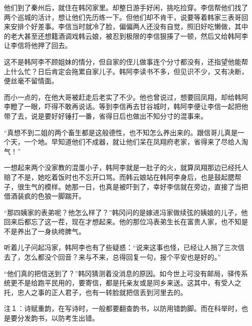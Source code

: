 他们到了秦州后，就住在韩冈家里。却整日游手好闲，挑吃捡穿。李信帮他们找了两个巡城的活计，想让他们先历练一下。但他们却不肯干，说要等着韩家三表哥回来安排个好差事。李信当时就冷了脸，偏偏两人还没有自觉，照旧好吃懒做，其中的老大甚至还想籍酒调戏韩云娘，被忍到极限的李信狠揍了一顿，然后又给韩阿李让李信将他押了回去。

这不是韩阿李不顾姐妹的情分，但自家的侄儿做事连个分寸都没有，还指望他能帮上什么忙？日后肯定会拖累自家儿子。韩阿李读书不多，但见识不少，又有决断，便丝毫不留情面。

而小一点的，在他大哥被赶走后老实了不少。他也曾说过，想要回凤翔，却给韩阿李瞪了一眼，吓得不敢再说话。等到李信再去甘谷城时，韩阿李便让李信一起把他带了去，说是要好好锤打一番，省得日后也做出不知分寸的混事来。

“真想不到二姐的两个畜生都是这般德性，也不知怎么养出来的。跟信哥儿真是一个天，一个地。早知道他们不成器，就让他们呆在凤翔府老家，省得来了尽给人淘气！”

一想起来两个没家教的混蛋小子，韩阿李就是一肚子的火，就算凤翔那边已经托人赔了不是，她吃着饭时也不忘开口骂。而韩云娘站在韩阿李身后，也是鼓起腮帮子，很生气的模样。她那一日，也真是被吓到了，幸好李信就在旁边，直接了当把借酒装疯的色狼一脚踹开。

“那四姨家的表弟呢？他怎么样了？”韩冈问的是嫁进冯家做续弦的姨娘的儿子，他回来后都忘了这一茬，现在才想起来。他的那位冯表弟生长在富贵人家，也不知是不是养出了一身纨绔脾气。

听着儿子问起冯家，韩阿李也有了些疑惑：“说来这事也怪，已经让人捎了三次信去了，怎么都没个回音？来与不来，总得回复一句，报个平安也是好的。”

“他们真的把信送到了？”韩冈猜测着没消息的原因。如今世上可没有邮局，驿传系统更不是给跑平民用的，要寄信，都是托亲友或是同乡来送。这其中，有受人之托，忠人之事的正人君子，也有一转脸就把信丢到河里去的。

注１：诗赋重韵，在写诗时，一般都要翻查韵书，以防用错韵脚。而在科举时，也是要分发韵书，以防考生出错。

